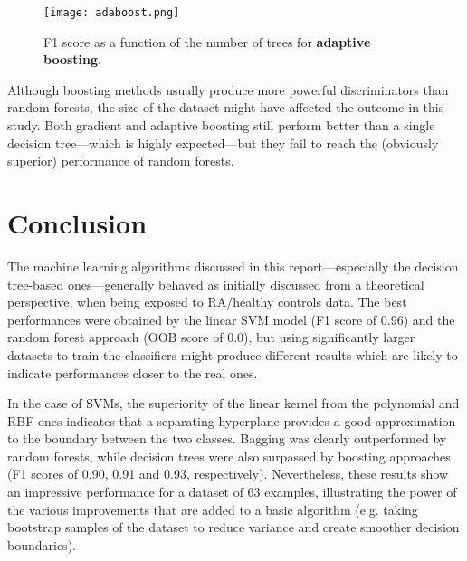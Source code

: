 \documentclass[11pt]{article}
\numberwithin{equation}{section}
\begin{document}
\begin{figure}[H]
\texttt{[image: adaboost.png]}
\caption{F1 score as a function of the number of trees for \textbf{adaptive boosting}.}
\end{figure}

Although boosting methods usually produce more powerful discriminators than random forests, the size of the dataset might have affected the outcome in this study. Both gradient and adaptive boosting still perform better than a single decision tree---which is highly expected---but they fail to reach the (obviously superior) performance of random forests.

\section{Conclusion}

The machine learning algorithms discussed in this report---especially the decision tree-based ones---generally behaved as initially discussed from a theoretical perspective, when being exposed to RA/healthy controls data. The best performances were obtained by the linear SVM model (F1 score of 0.96) and the random forest approach (OOB score of 0.0), but using significantly larger datasets to train the classifiers might produce different results which are likely to indicate performances closer to the real ones.

In the case of SVMs, the superiority of the linear kernel from the polynomial and RBF ones indicates that a separating hyperplane provides a good approximation to the boundary between the two classes. Bagging was clearly outperformed by random forests, while decision trees were also surpassed by boosting approaches (F1 scores of 0.90, 0.91 and 0.93, respectively). Nevertheless, these results show an impressive performance for a dataset of 63 examples, illustrating the power of the various improvements that are added to a basic algorithm (e.g. taking bootstrap samples of the dataset to reduce variance and create smoother decision boundaries).
\end{document}
